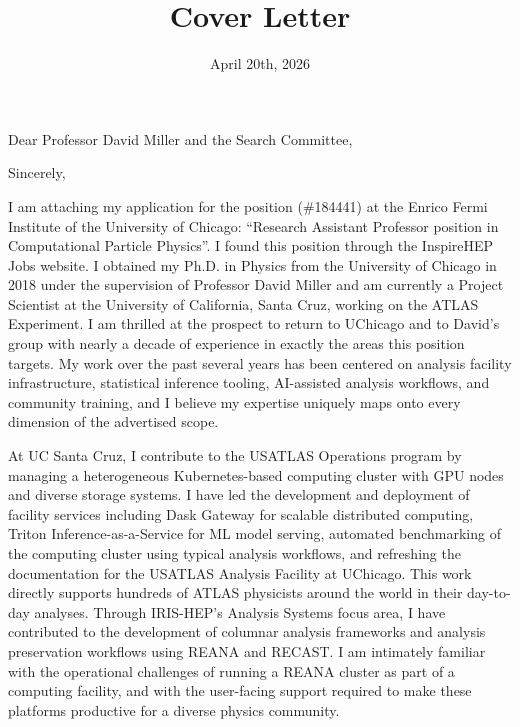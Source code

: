 \documentclass[10pt,letterpaper,sans]{moderncv} %
\title{Cover Letter}
\begin{document}
\date{April 20th, 2026}
\opening{Dear Professor David Miller and the Search Committee,}
\closing{Sincerely,}

\makelettertitle
\vspace*{-1em}

I am attaching my application for the position (\#184441) at the Enrico Fermi Institute of the University of Chicago: ``Research Assistant Professor position in Computational Particle Physics''. I found this position through the InspireHEP Jobs website. I obtained my Ph.D. in Physics from the University of Chicago in 2018 under the supervision of Professor David Miller and am currently a Project Scientist at the University of California, Santa Cruz, working on the ATLAS Experiment. I am thrilled at the prospect to return to UChicago and to David's group with nearly a decade of experience in exactly the areas this position targets. My work over the past several years has been centered on analysis facility infrastructure, statistical inference tooling, AI-assisted analysis workflows, and community training, and I believe my expertise uniquely maps onto every dimension of the advertised scope.

At UC Santa Cruz, I contribute to the USATLAS Operations program by managing a heterogeneous Kubernetes-based computing cluster with GPU nodes and diverse storage systems. I have led the development and deployment of facility services including Dask Gateway for scalable distributed computing, Triton Inference-as-a-Service for ML model serving, automated benchmarking of the computing cluster using typical analysis workflows, and refreshing the documentation for the USATLAS Analysis Facility at UChicago. This work directly supports hundreds of ATLAS physicists around the world in their day-to-day analyses. Through IRIS-HEP's Analysis Systems focus area, I have contributed to the development of columnar analysis frameworks and analysis preservation workflows using REANA and RECAST. I am intimately familiar with the operational challenges of running a REANA cluster as part of a computing facility, and with the user-facing support required to make these platforms productive for a diverse physics community.
\end{document}
